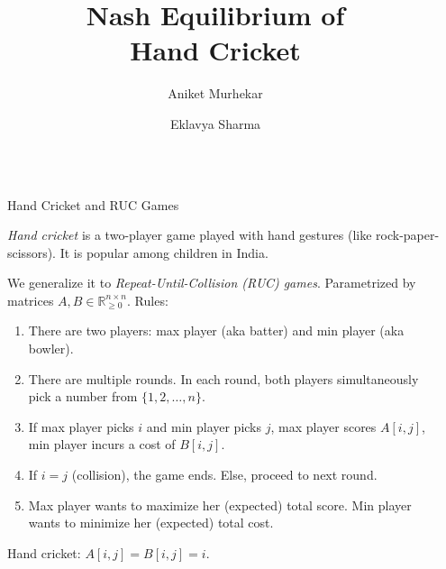 \documentclass[final,20pt]{beamer}
\title{Nash Equilibrium of\texorpdfstring{\\}{ }Hand Cricket}
\author{Aniket Murhekar \inst{1} \and Eklavya Sharma \inst{2}}
\institute[shortinst]{\inst{1} aniket2@illinois.edu \samelineand \inst{2} eklavya2@illinois.edu}
\newlength{\sepwidth}
\newlength{\colwidth}
\newcommand{\separatorcolumn}{\begin{column}{\sepwidth}\end{column}}
\begin{document}
\begin{frame}[t]
\begin{columns}[t]
\separatorcolumn

\begin{column}{\colwidth}

\begin{block}{Hand Cricket and RUC Games}

\emph{Hand cricket} is a two-player game played with hand gestures (like rock-paper-scissors).
It is popular among children in India.

We generalize it to \emph{Repeat-Until-Collision (RUC) games}.
Parametrized by matrices $A, B \in \mathbb{R}_{\ge 0}^{n \times n}$.
Rules:
\begin{enumerate}
\item There are two players: max player (aka batter) and min player (aka bowler).
\item There are multiple rounds. In each round, both players simultaneously
    pick a number from $\{1, 2, \ldots, n\}$.
\item If max player picks $i$ and min player picks $j$,
    max player scores $A[i, j]$, min player incurs a cost of $B[i, j]$.
\item If $i = j$ (collision), the game ends. Else, proceed to next round.
\item Max player wants to maximize her (expected) total score.
    Min player wants to minimize her (expected) total cost.
\end{enumerate}

Hand cricket: $A[i, j] = B[i, j] = i$.


\end{block}
\end{column}
\end{columns}
\end{frame}
\end{document}
